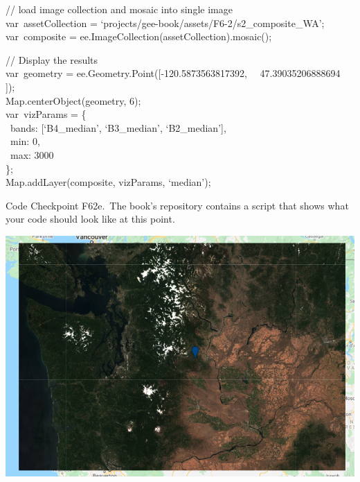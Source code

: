 \documentclass[
  letterpaper,
  DIV=11,
  numbers=noendperiod]{scrreprt}
\begin{document}
// load image collection and mosaic into single image\\
var~assetCollection =
`projects/gee-book/assets/F6-2/s2\_composite\_WA';\\
var~composite = ee.ImageCollection(assetCollection).mosaic();

// Display the results\\
var~geometry = ee.Geometry.Point({[}-120.5873563817392,~
~47.39035206888694\\
{]});\\
Map.centerObject(geometry, 6);\\
var~vizParams = \{\\
\hspace*{0.333em} ~bands: {[}`B4\_median', `B3\_median',
`B2\_median'{]},\\
\hspace*{0.333em} ~min: 0,\\
\hspace*{0.333em} ~max: 3000\\
\};\\
Map.addLayer(composite, vizParams, `median');

\begin{tcolorbox}[enhanced jigsaw, left=2mm, breakable, rightrule=.15mm, opacityback=0, colframe=quarto-callout-note-color-frame, colbacktitle=quarto-callout-note-color!10!white, arc=.35mm, opacitybacktitle=0.6, toptitle=1mm, colback=white, leftrule=.75mm, title=\textcolor{quarto-callout-note-color}{\faInfo}\hspace{0.5em}{Note}, toprule=.15mm, bottomtitle=1mm, titlerule=0mm, bottomrule=.15mm, coltitle=black]

Code Checkpoint F62e.~The book's repository contains a script that shows
what your code should look like at this point.

\end{tcolorbox}

\includegraphics{./F6/image16.png}
\end{document}

